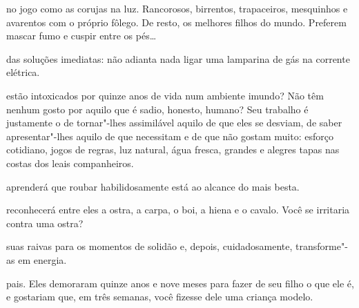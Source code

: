  no jogo como as corujas na luz. Rancorosos, birrentos,
trapaceiros, mesquinhos e avarentos com o próprio fôlego. De resto, os
melhores filhos do mundo. Preferem mascar fumo e cuspir entre os pés\ldots{}


 das soluções imediatas: não adianta nada ligar uma lamparina
de gás na corrente elétrica.



\pagebreak


 estão intoxicados por quinze anos de vida num ambiente imundo? Não
têm nenhum gosto por aquilo que é sadio, honesto, humano? Seu trabalho é
justamente o de tornar"-lhes assimilável aquilo de que eles se desviam,
de saber apresentar"-lhes aquilo de que necessitam e de que não gostam
muito: esforço cotidiano, jogos de regras, luz natural, água fresca,
grandes e alegres tapas nas costas dos leais companheiros.



 aprenderá que roubar habilidosamente está ao alcance do mais besta.



 reconhecerá entre eles a ostra, a carpa, o boi, a hiena e o cavalo.
Você se irritaria contra uma ostra?



 suas raivas para os momentos de solidão e, depois, cuidadosamente,
transforme"-as em energia.



 pais. Eles demoraram quinze anos e nove meses para fazer de seu filho
o que ele é, e gostariam que, em três semanas, você fizesse dele uma
criança modelo.



\pagebreak
\thispagestyle{empty}

